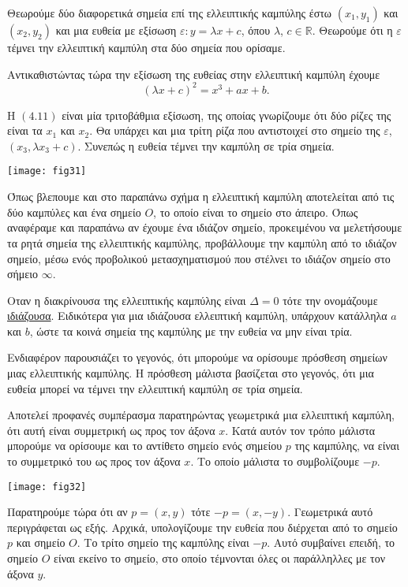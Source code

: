 \documentclass[12pt, a4paper]{book}
\begin{document}
Θεωρούμε δύο διαφορετικά σημεία επί της ελλειπτικής καμπύλης έστω $(x_1,y_1)$ και $(x_2,y_2)$ και μια ευθεία με εξίσωση $ε: y=λx+c$, όπου $λ$, $c \in \mathbb{R}$. Θεωρούμε ότι η $ε$ τέμνει την ελλειπτική καμπύλη στα δύο σημεία που ορίσαμε.

Αντικαθιστώντας τώρα την εξίσωση της ευθείας στην ελλειπτική καμπύλη έχουμε
\begin{equation}
(λx+c)^2=x^3+ax+b. 
\end{equation}

H $(4.11)$ είναι μία τριτοβάθμια εξίσωση, της οποίας γνωρίζουμε ότι δύο ρίζες της είναι τα $x_1$ και $x_2$. Θα υπάρχει και μια τρίτη ρίζα που αντιστοιχεί στο σημείο της $ε$, $(x_3,λx_3+c)$. Συνεπώς η ευθεία τέμνει την καμπύλη σε τρία σημεία.

\begin{center}
\texttt{[image: fig31]}
\end{center}

Όπως βλεπουμε και στο παραπάνω σχήμα η ελλειπτική καμπύλη αποτελείται από τις δύο καμπύλες και ένα σημείο $O$, το οποίο είναι το σημείο στο άπειρο. Όπως αναφέραμε και παραπάνω αν έχουμε ένα ιδιάζον σημείο, προκειμένου να μελετήσουμε τα ρητά σημεία της ελλειπτικής καμπύλης, προβάλλουμε την καμπύλη από το ιδιάζον σημείο, μέσω ενός προβολικού μετασχηματισμού που στέλνει το ιδιάζον σημείο στο σήμειο $\infty$.  

Oταν η διακρίνουσα της ελλειπτικής καμπύλης είναι $\Delta = 0$ τότε την ονομάζουμε \underline{ιδιάζουσα}. Ειδικότερα για μια ιδιάζουσα ελλειπτική καμπύλη, υπάρχουν κατάλληλα $a$ και $b$, ώστε τα κοινά σημεία της καμπύλης με την ευθεία να μην είναι τρία.

Ενδιαφέρον παρουσιάζει το γεγονός, ότι μπορούμε να ορίσουμε πρόσθεση σημείων μιας ελλειπτικής καμπύλης. Η πρόσθεση μάλιστα βασίζεται στο γεγονός, ότι μια ευθεία μπορεί να τέμνει την ελλειπτική καμπύλη σε τρία σημεία. \newpage

Αποτελεί προφανές συμπέρασμα παρατηρώντας γεωμετρικά μια ελλειπτική καμπύλη, ότι αυτή είναι συμμετρική ως προς τον άξονα $x$. Κατά αυτόν τον τρόπο μάλιστα μπορούμε να ορίσουμε και το αντίθετο σημείο ενός σημείου $p$  της καμπύλης, να είναι το συμμετρικό του ως προς τον άξονα $x$. Το οποίο μάλιστα το συμβολίζουμε $-p$.

\begin{center}
\texttt{[image: fig32]}
\end{center}

Παρατηρούμε τώρα ότι αν $p = (x,y)$ τότε $-p=(x,-y)$. Γεωμετρικά αυτό περιγράφεται ως εξής. Αρχικά, υπολογίζουμε την ευθεία που διέρχεται από το σημείο $p$ και σημείο $O$. Το τρίτο σημείο της καμπύλης είναι $-p$. Αυτό συμβαίνει επειδή, το σημείο $O$ είναι εκείνο το σημείο, στο οποίο τέμνονται όλες οι παράλληλλες με τον άξονα $y$.
\end{document}
